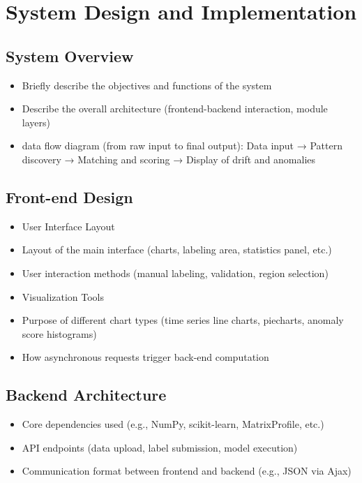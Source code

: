 \chapter{System Design and Implementation}



\section{System Overview}
\begin{itemize}
    \item Briefly describe the objectives and functions of the system  
    \item Describe the overall architecture (frontend-backend interaction, module layers)
    \item data flow diagram (from raw input to final output):  Data input → Pattern discovery → Matching and scoring → Display of drift and anomalies 
\end{itemize}

\section{Front-end Design}
\begin{itemize}
    \item User Interface Layout
    \item Layout of the main interface (charts, labeling area, statistics panel, etc.)
    \item User interaction methods (manual labeling, validation, region selection)
    \item Visualization Tools
    \item Purpose of different chart types (time series line charts, piecharts, anomaly score histograms)
    \item How asynchronous requests trigger back-end computation
\end{itemize}

\section{Backend Architecture}
\begin{itemize}
    \item Core dependencies used (e.g., NumPy, scikit-learn, MatrixProfile, etc.)
    \item API endpoints (data upload, label submission, model execution)
    \item Communication format between frontend and backend (e.g., JSON via Ajax)
\end{itemize}

